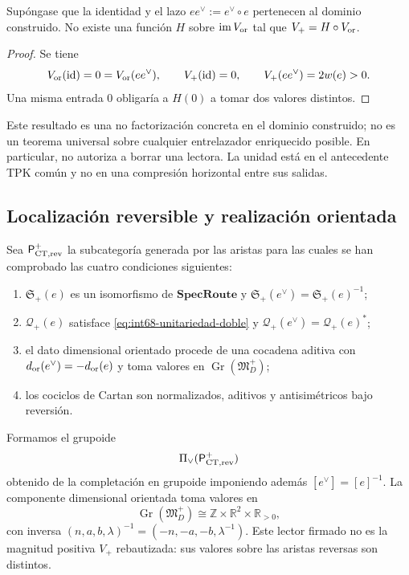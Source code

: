 \begin{proposition}
\label{prop:int68-no-factorizacion}
Supóngase que la identidad y el lazo
\(ee^\vee:=e^\vee\circ e\) pertenecen al dominio construido. No existe una
función \(H\) sobre \(\operatorname{im}V_{\rm or}\) tal que
\(V_+=H\circ V_{\rm or}\).
\end{proposition}

\begin{proof}
Se tiene
\[
 V_{\rm or}(\operatorname{id})=0
 =V_{\rm or}(ee^\vee),
 \qquad
 V_+(\operatorname{id})=0,
 \qquad
 V_+(ee^\vee)=2w(e)>0.
\]
Una misma entrada \(0\) obligaría a \(H(0)\) a tomar dos valores distintos.
\end{proof}

Este resultado es una no factorización concreta en el dominio construido; no
es un teorema universal sobre cualquier entrelazador enriquecido posible.
En particular, no autoriza a borrar una lectora. La unidad está en el
antecedente TPK común y no en una compresión horizontal entre sus salidas.

\subsection{Localización reversible y realización orientada}

Sea \(\mathsf P_{{\rm CT},{\rm rev}}^+\) la subcategoría generada por las
aristas para las cuales se han comprobado las cuatro condiciones siguientes:
\begin{enumerate}
 \item \(\mathfrak S_+(e)\) es un isomorfismo de
       \(\mathbf{SpecRoute}\) y
       \(\mathfrak S_+(e^\vee)=\mathfrak S_+(e)^{-1}\);
 \item \(\mathcal Q_+(e)\) satisface
       \eqref{eq:int68-unitariedad-doble} y
       \(\mathcal Q_+(e^\vee)=\mathcal Q_+(e)^*\);
 \item el dato dimensional orientado procede de una cocadena aditiva con
       \(d_{\rm or}(e^\vee)=-d_{\rm or}(e)\) y toma valores en
       \(\operatorname{Gr}(\mathfrak M_D^+)\);
 \item los cociclos de Cartan son normalizados, aditivos y antisimétricos
       bajo reversión.
\end{enumerate}
Formamos el grupoide
\[
 \Pi_\vee(\mathsf P_{{\rm CT},{\rm rev}}^+)
\]
obtenido de la completación en grupoide imponiendo además
\([e^\vee]=[e]^{-1}\). La componente dimensional orientada toma valores en
\begin{equation}
 \operatorname{Gr}(\mathfrak M_D^+)
 \cong\mathbb Z\times\mathbb R^2\times\mathbb R_{>0},
 \label{eq:int68-grothendieck-dimensional}
\end{equation}
con inversa
\((n,a,b,\lambda)^{-1}=(-n,-a,-b,\lambda^{-1})\). Este lector firmado no es
la magnitud positiva \(V_+\) rebautizada: sus valores sobre las aristas
reversas son distintos.

